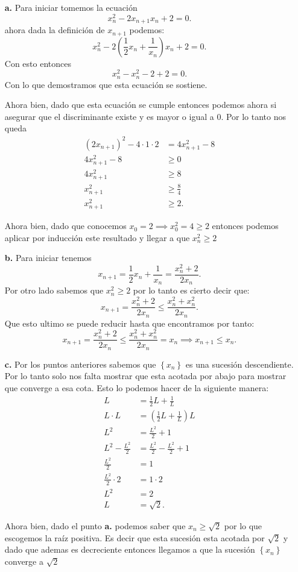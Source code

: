 \documentclass{report}
\begin{document}
\begin{enumerate}
  \item[\textbf{a.}] Para iniciar tomemos la ecuación \[
  x_n^2 - 2x_{n+1}x_n + 2 = 0
  .\] ahora dada la definición de $x_{n + 1}$ podemos: \[
  x_n^2 - 2\left(\frac{1}{2}x_n + \frac{1}{x_n}\right)x_n + 2 = 0
  .\] Con esto entonces \[
  x_n^2 - x_n^2 - 2 + 2 = 0
  .\] Con lo que demostramos que esta ecuación se sostiene.

  Ahora bien, dado que esta ecuación se cumple entonces podemos ahora si asegurar que el discriminante existe y es mayor o igual a 0. Por lo tanto nos queda
  \begin{align*}
    \left( 2 x_{n+1} \right)^2 - 4 \cdot 1 \cdot 2 &= 4x_{n+1}^2 - 8 \\
    4x_{n+1}^2 - 8 &\ge 0\\
    4x_{n+1}^2 &\ge 8\\
    x_{n + 1}^2 &\ge \frac{8}{4}\\
    x_{n+1}^2 &\ge 2
  .\end{align*}

  Ahora bien, dado que conocemos $x_0 = 2 \implies x_0^2 = 4 \ge 2$ entonces podemos aplicar por inducción este resultado y llegar a que $x_n^2 \ge 2$
  \item[\textbf{b.}] Para iniciar tenemos \[
  x_{n+1} = \frac{1}{2}x_n + \frac{1}{x_n} = \frac{x_n^2 + 2}{2x_n}
  .\] Por otro lado sabemos que $x_{n}^2 \ge 2$ por lo tanto es cierto decir que: \[
  x_{n+1} = \frac{x_n^2 + 2}{2x_{n}} \le \frac{x_{n}^2 + x_{n}^2}{2x_{n}}
  .\] Que esto ultimo se puede reducir hasta que encontramos por tanto: \[
  x_{n+1} = \frac{x_{n}^2 + 2}{2x_n} \le \frac{x_n^2 + x_n^2}{2x_n} = x_n \implies x_{n+1} \le x_n
  .\] 
  \item[\textbf{c.}] Por los puntos anteriores sabemos que $\left\{ x_n \right\} $ es una sucesión descendiente. Por lo tanto solo nos falta mostrar que esta acotada por abajo para mostrar que converge a esa cota. Esto lo podemos hacer de la siguiente manera:
    \begin{align*}
      L &= \frac{1}{2}L + \frac{1}{L} \\
      L\cdot L &= \left( \frac{1}{2}L + \frac{1}{L} \right)L \\
      L^2 &= \frac{L^2}{2} + 1 \\
      L^2 - \frac{L^2}{2} &= \frac{L^2}{2} - \frac{L^2}{2} + 1 \\
      \frac{L^2}{2} &= 1 \\
      \frac{L^2}{2}\cdot 2 &= 1\cdot 2 \\
      L^2 &= 2 \\
      L &= \sqrt{2}
    .\end{align*}

    Ahora bien, dado el punto \textbf{a.} podemos saber que $x_n \ge \sqrt{2}$ por lo que escogemos la raíz positiva. Es decir que esta sucesión esta acotada por $\sqrt{2} $ y dado que ademas es decreciente entonces llegamos a que la sucesión $\left\{ x_n \right\} $ converge a $\sqrt{2} $
\end{enumerate}
\end{document}
